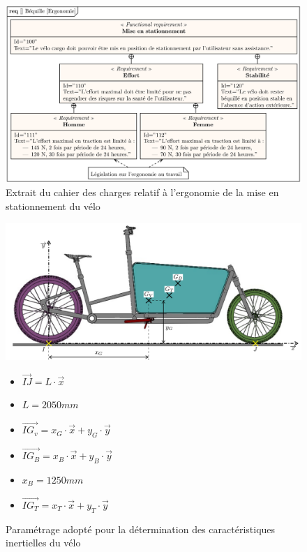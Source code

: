 \begin{figure}[ht!]
\begin{center}
\includegraphics[width=.95\linewidth]{img/fig01}
\caption{\label{fig01}Extrait du cahier des charges relatif à l'ergonomie de la mise en stationnement du vélo}
\end{center}
\end{figure}

\newpage

\begin{figure}[ht!]
\begin{minipage}{0.7\linewidth}
\begin{center}
\includegraphics[width=\linewidth]{img/fig02}
\caption{\label{fig02}Paramétrage adopté pour la détermination des caractéristiques inertielles du vélo}
\end{center}
\end{minipage}\hfill
\begin{minipage}{0.27\linewidth}
\begin{itemize}
 \item $\overrightarrow{IJ}=L\cdot \vec{x}$
 \item $L=2050mm$
 \item $\overrightarrow{IG_v}=x_G\cdot \vec{x}+y_G\cdot \vec{y}$
 \item $\overrightarrow{IG_B}=x_B\cdot \vec{x}+y_B\cdot \vec{y}$
 \item $x_B=1250mm$
 \item $\overrightarrow{IG_T}=x_T\cdot \vec{x}+y_T\cdot \vec{y}$
\end{itemize}
\end{minipage}
\end{figure}

